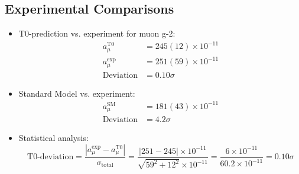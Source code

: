 \documentclass[12pt,a4paper]{article}
\begin{document}
\subsection{Experimental Comparisons}
\begin{itemize}
	\item T0-prediction vs. experiment for muon g-2:
	\begin{align}
		a_\mu^{\text{T0}} &= 245(12) \times 10^{-11} \\
		a_\mu^{\text{exp}} &= 251(59) \times 10^{-11} \\
		\text{Deviation} &= 0.10\sigma
	\end{align}
	
	\item Standard Model vs. experiment:
	\begin{align}
		a_\mu^{\text{SM}} &= 181(43) \times 10^{-11} \\
		\text{Deviation} &= 4.2\sigma
	\end{align}
	
	\item Statistical analysis:
	\begin{equation}
		\text{T0-deviation} = \frac{|a_\mu^{\text{exp}} - a_\mu^{\text{T0}}|}{\sigma_{\text{total}}} = \frac{|251 - 245| \times 10^{-11}}{\sqrt{59^2 + 12^2} \times 10^{-11}} = \frac{6 \times 10^{-11}}{60.2 \times 10^{-11}} = 0.10\sigma
	\end{equation}
\end{itemize}
\end{document}
